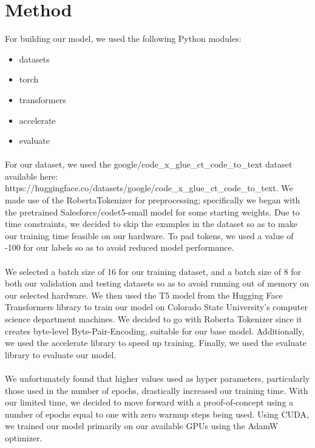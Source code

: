 \documentclass[12pt]{article}
\begin{document}
	\section{Method}
	For building our model, we used the following Python modules:
	\begin{itemize}
		\item datasets
		\item torch
		\item transformers
		\item accelerate
		\item evaluate
	\end{itemize}
	\paragraph{} For our dataset, we used the google/code\_x\_glue\_ct\_code\_to\_text dataset available here: https://huggingface.co/datasets/google/code\_x\_glue\_ct\_code\_to\_text. We made use of the RobertaTokenizer for preprocessing; specifically we began with the pretrained Salesforce/codet5-small model for some starting weights. Due to time constraints, we decided to skip the examples in the dataset so as to make our training time feasible on our hardware. To pad tokens, we used a value of -100 for our labels so as to avoid reduced model performance. 
	\paragraph{} We selected a batch size of 16 for our training dataset, and a batch size of 8 for both our validation and testing datasets so as to avoid running out of memory on our selected hardware. We then used the T5 model from the Hugging Face Transformers library to train our model on Colorado State University's computer science department machines. We decided to go with Roberta Tokenizer since it creates byte-level Byte-Pair-Encoding, suitable for our base model. Additionally, we used the accelerate library to speed up training. Finally, we used the evaluate library to evaluate our model.
	\paragraph{} We unfortunately found that higher values used as hyper parameters, particularly those used in the number of epochs, drastically increased our training time. With our limited time, we decided to move forward with a proof-of-concept using a number of epochs equal to one with zero warmup steps being used. Using CUDA, we trained our model primarily on our available GPUs using the AdamW optimizer.
\end{document}
